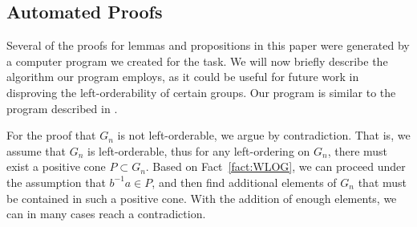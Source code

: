 


\subsection{Automated Proofs}
Several of the proofs for lemmas and propositions in this paper were generated by a computer program we created for the task. We will now briefly describe the algorithm our program employs, as it could be useful for future work in disproving the left-orderability of certain groups. Our program is similar to the program described in \cite[Section 8]{CalegariDunfield}.

For the proof that $G_n$ is not left-orderable, we argue by contradiction. That is, we assume that $G_n$ is left-orderable, thus for any left-ordering on $G_n$, there must exist a positive cone $P\subset{}G_n$. Based on Fact~\ref{fact:WLOG}, we can proceed under the assumption that $b^{-1}a\in{}P$, and then find additional elements of $G_n$ that must be contained in such a positive cone. With the addition of enough elements, we can in many cases reach a contradiction.

